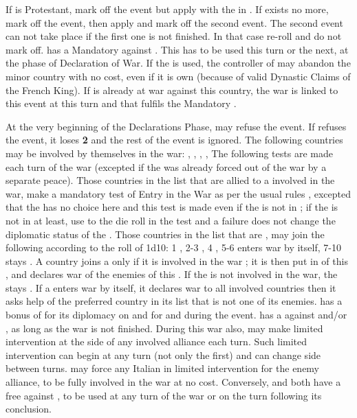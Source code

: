 

\aparag If \FRA is Protestant, mark off the event but apply \RD with the
\REVOLT in \FRA.
\aparag If \paysNaples exists no more, mark off the event, then apply and mark
off the second event.
\aparag The second event can not take place if the first one is not
finished. In that case re-roll and do not mark off. \phevnt
\aparag \FRA has a Mandatory \CB against \paysNaples. This \CB has to be used
this turn or the next, at the phase of Declaration of War. If the \CB is used,
the controller of \paysNaples may abandon the minor country with no cost, even
if it is own \VASSAL (because of valid Dynastic Claims of the French King).
\aparag If \FRA is already at war against this country, the war is linked to
this event at this turn and that fulfils the Mandatory \CB.

\phdipl
{}
\bparag At the very beginning of the Declarations Phase, \FRA may refuse the
event.
\bparag If \FRA refuses the event, it loses {\bf 2} \STAB and the rest of the
event is ignored.
\bparag The following countries may be involved by themselves in the war:
\paysGenes, \paysMilan, \payspapaute, \paysSavoie, The following tests are
made each turn of the war (excepted if the \MIN was already forced out of the
war by a separate peace).
\bparag Those countries in the list that are allied to a \MAJ involved in the
war, make a mandatory test of Entry in the War as per the usual rules
, excepted that the \MAJ has no choice here
and this test is made even if the \MIN is not in \EG; if the \MIN is not in
\EG at least, use  to the die roll in the test and a failure does
not change the diplomatic status of the \MIN.
\bparag Those countries in the list that are \Neutral, may join the following
\MAJ according to the roll of 1d10: 1 \FRA, 2-3 \HAB, 4 \VEN, 5-6 enters war
by itself, 7-10 stays \Neutral. A country joins a \MAJ only if it is involved
in the war ; it is then put in \EG of this \MAJ, and declares war of the
enemies of this \MAJ. If the \MAJ is not involved in the war, the \MIN stays
\Neutral.
\bparag If a \MIN enters war by itself, it declares war to all involved
countries then it asks help of the preferred country in its list that is not
one of its enemies.
 \FRA has a bonus of  for its
diplomacy on \paysToscane and  for \payspapaute and \paysParme
during the event.
\bparag \VEN has a \CB against \FRA and/or \paysNaples, as long as the war is
not finished.
\bparag During this war also, \VEN may make limited intervention at the side
of any involved alliance each turn. Such limited intervention can begin at any
turn (not only the first) and \VEN can change side between turns. \VEN may
force any Italian \MIN in limited intervention for the enemy alliance, to be
fully involved in the war at no cost.
\bparag Conversely, \FRA and \HAB both have a free \CB against \VEN, to be
used at any turn of the war or on the turn following its conclusion.

